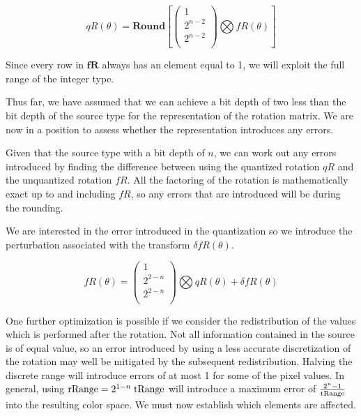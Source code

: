 \begin{equation}
 qR(\theta) =
\textbf{Round}[
\left(
\begin{array}{c}
 1  \\
 2^{n - 2} \\
 2^{n - 2}  \\
\end{array}
\right)
\bigotimes
fR(\theta)]
\end{equation}

Since every row in $\mathbf{fR}$ always has an element equal to 1, we will exploit the full range of the integer type. 

Thus far, we have assumed that we can achieve a bit depth of two less than the bit depth of the source type for the representation of the rotation matrix. We are now in a position to assess whether the representation introduces any errors.

Given that the source type with a bit depth of $n$, we can work out any errors introduced by finding the difference between using the quantized rotation $qR$ and the unquantized rotation $fR$. All the factoring of the rotation is mathematically exact up to and including $fR$, so any errors that are introduced will be during the rounding.

We are interested in the error introduced in the quantization so we introduce the perturbation associated with the transform $\delta fR(\theta)$. 



\begin{equation}
 fR(\theta) =
\left(
\begin{array}{c}
 1  \\
 2^{2-n } \\
 2^{2-n }  \\
\end{array}
\right)
\bigotimes
qR(\theta) + \delta fR(\theta)
\end{equation}


One further optimization is possible if we consider the redistribution of the values which is performed after the rotation. Not all information contained in the source is of equal value, so an error introduced by using a less accurate discretization of the rotation may well be mitigated by the subsequent redistribution. Halving the discrete range will introduce errors of at most 1 for some of the pixel values. In general, using $\text{rRange} = 2^{1-n} \; \text{tRange}$ will introduce a maximum error of $\frac{2^n -1}{\text{tRange}}$ into the resulting color space. We must now establish which elements are affected.

